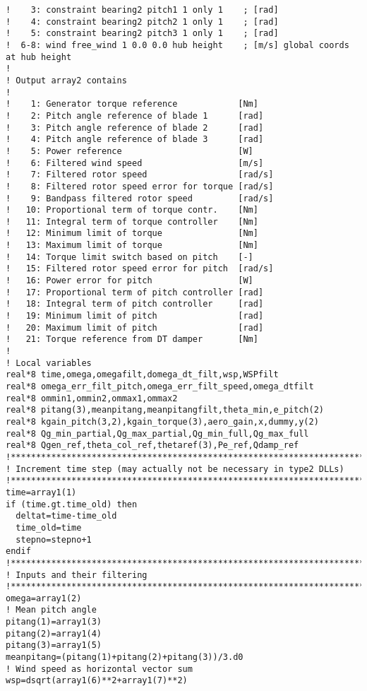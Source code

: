 {\begin{verbatim}
!    3: constraint bearing2 pitch1 1 only 1    ; [rad]
!    4: constraint bearing2 pitch2 1 only 1    ; [rad]
!    5: constraint bearing2 pitch3 1 only 1    ; [rad]
!  6-8: wind free_wind 1 0.0 0.0 hub height    ; [m/s] global coords at hub height
!
! Output array2 contains
!
!    1: Generator torque reference            [Nm]
!    2: Pitch angle reference of blade 1      [rad]
!    3: Pitch angle reference of blade 2      [rad]
!    4: Pitch angle reference of blade 3      [rad]
!    5: Power reference                       [W]
!    6: Filtered wind speed                   [m/s]
!    7: Filtered rotor speed                  [rad/s]
!    8: Filtered rotor speed error for torque [rad/s]
!    9: Bandpass filtered rotor speed         [rad/s]
!   10: Proportional term of torque contr.    [Nm]
!   11: Integral term of torque controller    [Nm]
!   12: Minimum limit of torque               [Nm]
!   13: Maximum limit of torque               [Nm]
!   14: Torque limit switch based on pitch    [-]
!   15: Filtered rotor speed error for pitch  [rad/s]
!   16: Power error for pitch                 [W]
!   17: Proportional term of pitch controller [rad]
!   18: Integral term of pitch controller     [rad]
!   19: Minimum limit of pitch                [rad]
!   20: Maximum limit of pitch                [rad]
!   21: Torque reference from DT damper       [Nm]
!
! Local variables
real*8 time,omega,omegafilt,domega_dt_filt,wsp,WSPfilt
real*8 omega_err_filt_pitch,omega_err_filt_speed,omega_dtfilt
real*8 ommin1,ommin2,ommax1,ommax2
real*8 pitang(3),meanpitang,meanpitangfilt,theta_min,e_pitch(2)
real*8 kgain_pitch(3,2),kgain_torque(3),aero_gain,x,dummy,y(2)
real*8 Qg_min_partial,Qg_max_partial,Qg_min_full,Qg_max_full
real*8 Qgen_ref,theta_col_ref,thetaref(3),Pe_ref,Qdamp_ref
!**************************************************************************************************
! Increment time step (may actually not be necessary in type2 DLLs)
!**************************************************************************************************
time=array1(1)
if (time.gt.time_old) then
  deltat=time-time_old
  time_old=time
  stepno=stepno+1
endif
!**************************************************************************************************
! Inputs and their filtering
!**************************************************************************************************
omega=array1(2)
! Mean pitch angle
pitang(1)=array1(3)
pitang(2)=array1(4)
pitang(3)=array1(5)
meanpitang=(pitang(1)+pitang(2)+pitang(3))/3.d0
! Wind speed as horizontal vector sum
wsp=dsqrt(array1(6)**2+array1(7)**2)

\end{verbatim}}
